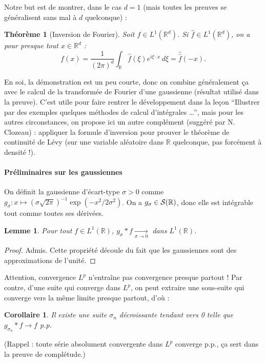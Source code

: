 \documentclass[a4paper, 11pt]{article}
\def\R{\mathbb{R}}
\def\S{{\cal{S}}}
\newtheorem*{theorem}{Théorème}
\newtheorem*{lemma}{Lemme}
\newtheorem*{corollary}{Corollaire}
\begin{document}
Notre but est de montrer, dans le cas $d = 1$ (mais toutes les preuves se
généralisent sans mal à $d$ quelconque) :

\begin{theorem}[Inversion de Fourier]
  Soit $f \in L^1(\R^d)$. Si $\hat{f} \in L^1(\R^d)$, on a pour presque
  tout $x \in \R^d$ :
\[ f(x) = \frac{1}{(2\pi)^d} \int_\R \hat{f}(\xi) e^{i\xi \cdot x} \,d\xi =
  \hat{\hat{f}}(-x). \]
\end{theorem}

En soi, la démonstration est un peu courte, donc on combine généralement ça avec
le calcul de la transformée de Fourier d'une gaussienne (résultat utilisé dans
la preuve). C'est utile pour faire rentrer le développement dans la leçon
\enquote{Illustrer par des exemples quelques méthodes de calcul d'intégrales …},
mais pour les autres circonstances, on propose ici un autre complément (suggéré
par N. Clozeau) : appliquer la formule d'inversion pour prouver le théorème de
continuité de Lévy (sur une variable aléatoire dans $\R$ quelconque, pas
forcément à densité !).

\paragraph{Préliminaires sur les gaussiennes}
On définit la gaussienne d'écart-type $\sigma > 0$ comme $g_\sigma : x \mapsto
(\sigma\sqrt{2\pi})^{-1}\exp(-x^2/2\sigma^2)$. On a $g_\sigma \in \S(\R)$, donc
elle est intégrable tout comme toutes ses dérivées.

\begin{lemma}
  Pour tout $f \in L^1(\R)$,
  $g_\sigma * f \xrightarrow[\sigma \to 0]{}$ dans $L^1(\R)$.
\end{lemma}
\begin{proof}
  Admis. Cette propriété découle du fait que les gaussiennes sont des
  approximations de l'unité.
\end{proof}

Attention, convergence $L^p$ n'entraîne pas convergence presque partout ! Par
contre, d'une suite qui converge dans $L^p$, on peut extraire une sous-suite qui
converge vers la même limite presque partout, d'où :
\begin{corollary}
  Il existe une suite $\sigma_n$ décroissante tendant vers 0 telle que
  $g_{\sigma_n} * f \rightarrow f$ p.p.
\end{corollary}
(Rappel : toute série absolument convergente dans $L^p$ converge p.p., ça
sert dans la preuve de complétude.)
\end{document}
